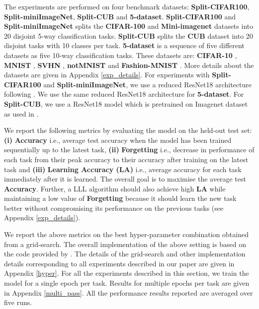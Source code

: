 \documentclass{article} \usepackage{collas2022_conference,times}
\begin{document}
    The experiments are performed on four benchmark datasets: \textbf{Split-CIFAR100}, \textbf{Split-miniImageNet}, \textbf{Split-CUB} and \textbf{5-dataset}. \textbf{Split-CIFAR100} and \textbf{Split-miniImageNet} splits the \textbf{CIFAR-100} \citep{krizhevsky2009learning,mirzadeh2020understanding} and \textbf{Mini-imagenet} \citep{vinyals2016matching,chaudhry2019tiny} datasets into 20 disjoint 5-way classification tasks. \textbf{Split-CUB} splits the \textbf{CUB} \citep{wah2011caltech} dataset into 20 disjoint tasks with 10 classes per task. \textbf{5-dataset} is a sequence of five different datasets as five 10-way classification tasks. These datasets are: \textbf{CIFAR-10} \citep{krizhevsky2009learning}, \textbf{MNIST} \citep{mnist}, \textbf{SVHN} \citep{netzer2011reading}, \textbf{notMNIST} \citep{notmnist} and \textbf{Fashion-MNIST} \citep{xiao2017fashion}. More details about the datasets are given in Appendix \ref{exp_details}.
For experiments with \textbf{Split-CIFAR100} and \textbf{Split-miniImageNet}, we use a reduced ResNet18 architecture following \citep{lopez2017gradient,chaudhry2019tiny}. We use the same reduced ResNet18 architecture for \textbf{5-dataset}. For \textbf{Split-CUB}, we use a ResNet18 model which is pretrained on Imagenet dataset \citep{imagenet_cvpr09} as used in \citep{chaudhry2019tiny}. 

    We report the following metrics by evaluating the model on the held-out test set: \textbf{(i)} \textbf{Accuracy} \citep{lopez2017gradient} i.e., average test accuracy when the model has been trained sequentially up to the latest task, \textbf{(ii)} \textbf{Forgetting} \citep{chaudhry2018riemannian} i.e., decrease in performance of each task from their peak accuracy to their accuracy after training on the latest task and \textbf{(iii)} \textbf{Learning Accuracy (LA)} \citep{riemer2018learning} i.e., average accuracy for each task immediately after it is learned.
    The overall goal is to maximise the average test \textbf{Accuracy}. Further, a LLL algorithm should also achieve high \textbf{LA} while maintaining a low value of \textbf{Forgetting} because it should learn the new task better without compromising its performance on the previous tasks (see Appendix \ref{exp_details}).





    
    We report the above metrics on the best hyper-parameter combination obtained from a grid-search. The overall implementation of the above setting is based on the code provided by \citep{mirzadeh2020understanding}. The details of the grid-search and other implementation details corresponding to all experiments described in our paper are given in Appendix \ref{hyper}. For all the experiments described in this section, we train the model for a single epoch per task. Results for multiple epochs per task are given in Appendix \ref{multi_pass}. All the performance results reported are averaged over five runs. 
\end{document}

